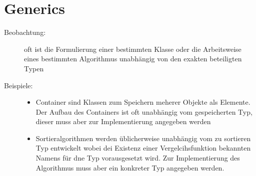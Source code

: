 \section{Generics}
\begin{description}
	\item[Beobachtung:] oft ist die Formulierung einer bestimmten Klasse oder die Arbeitsweise eines bestimmten Algorithmus unabhängig von den exakten beteiligten Typen
	\item[Beispiele:]
	\begin{itemize}
		\item Container sind Klassen zum Speichern meherer Objekte als Elemente. Der Aufbau des Containers ist oft unabhängig vom gespeicherten Typ, dieser muss aber zur Implementierung angegeben werden
		\item Sortieralgorithmen werden üblicherweise unabhängig vom zu sortieren Typ entwickelt wobei dei Existenz einer Vergelcihsfunktion bekannten Namens für dne Typ vorausgesetzt wird. Zur Implementierung des Algorithmus muss aber ein konkreter Typ angegeben werden.
	\end{itemize}
\end{description}
